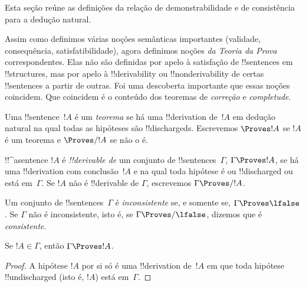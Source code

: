 \documentclass[../../../include/open-logic-section]{subfiles}
\begin{document}
      {}
      {}


\begin{editorial}
Esta seção reúne as definições da relação de demonstrabilidade
e de consistência para a dedução natural.
\end{editorial}

\begin{explain}
Assim como definimos várias noções semânticas importantes
(validade, consequência, satisfatibilidade), agora definimos noções
\emph{da Teoria da Prova} correspondentes.  Elas não são definidas por
apelo à satisfação de !!{sentence}s em !!{structure}s, mas por apelo à
!!{derivability} ou !!{nonderivability} de certas !!{sentence}s a
partir de outras.  Foi uma descoberta importante que essas noções
coincidem. Que coincidem é o conteúdo dos teoremas de
\emph{correção} e \emph{completude}.
\end{explain}


\begin{defn}[Teoremas]
Uma !!{sentence}~$!A$ é um \emph{teorema} se há uma !!{derivation}
de~$!A$ em dedução natural na qual todas as hipóteses são
!!{discharged}s.  Escrevemos $\Proves !A$ se $!A$ é um teorema e
$\Proves/ !A$ se não o é.
\end{defn}

\begin{defn}[!!^{derivability}]
!!^a{sentence} $!A$ é \emph{!!{derivable} de} um conjunto de
!!{sentence}s~$\Gamma$, $\Gamma \Proves !A$, se há uma
!!{derivation} com conclusão~$!A$ e na qual toda hipótese
é ou !!{discharged} ou está em~$\Gamma$. Se $!A$ não é
!!{derivable} de $\Gamma$, escrevemos $\Gamma \Proves/ !A$.
\end{defn}

\begin{defn}[Consistência]
Um conjunto de !!{sentence}s~$\Gamma$ é \emph{inconsistente} se, e somente se, $\Gamma
\Proves \lfalse$.  Se $\Gamma$ não é inconsistente, isto é, se
$\Gamma \Proves/ \lfalse$, dizemos que é \emph{consistente}.
\end{defn}

\begin{prop}[Reflexividade]
Se $!A \in \Gamma$, então $\Gamma \Proves !A$.
\end{prop}

\begin{proof}
A hipótese $!A$ por si só é uma !!{derivation} de~$!A$ em que toda
hipótese !!{undischarged} (isto é, $!A$) está em~$\Gamma$.
\end{proof}
  
\end{document}
